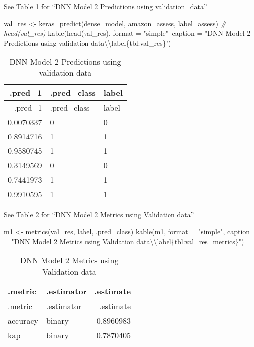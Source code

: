 \documentclass[
]{article}
\newenvironment{Shaded}{}{}
\newcommand{\AttributeTok}[1]{\textcolor[rgb]{0.49,0.56,0.16}{#1}}
\newcommand{\CommentTok}[1]{\textcolor[rgb]{0.38,0.63,0.69}{\textit{#1}}}
\newcommand{\FunctionTok}[1]{\textcolor[rgb]{0.02,0.16,0.49}{#1}}
\newcommand{\NormalTok}[1]{#1}
\newcommand{\OtherTok}[1]{\textcolor[rgb]{0.00,0.44,0.13}{#1}}
\newcommand{\SpecialCharTok}[1]{\textcolor[rgb]{0.25,0.44,0.63}{#1}}
\newcommand{\StringTok}[1]{\textcolor[rgb]{0.25,0.44,0.63}{#1}}
\begin{document}
See Table \ref{tbl:val_res} for ``DNN Model 2 Predictions using
validation\_data''

\begin{Shaded}
\begin{Highlighting}[]
\NormalTok{val\_res }\OtherTok{\textless{}{-}} \FunctionTok{keras\_predict}\NormalTok{(dense\_model, amazon\_assess, label\_assess)}
\CommentTok{\# head(val\_res)}
\FunctionTok{kable}\NormalTok{(}\FunctionTok{head}\NormalTok{(val\_res), }\AttributeTok{format =} \StringTok{"simple"}\NormalTok{, }\AttributeTok{caption =} \StringTok{"DNN Model 2 Predictions using validation data}\SpecialCharTok{\textbackslash{}\textbackslash{}}\StringTok{label\{tbl:val\_res\}"}\NormalTok{)}
\end{Highlighting}
\end{Shaded}

\begin{longtable}[]{@{}rll@{}}
\caption{DNN Model 2 Predictions using validation
data\label{tbl:val_res}}\tabularnewline
\toprule
.pred\_1 & .pred\_class & label \\
\midrule
\endfirsthead
\toprule
.pred\_1 & .pred\_class & label \\
\midrule
\endhead
0.0070337 & 0 & 0 \\
0.8914716 & 1 & 1 \\
0.9580745 & 1 & 1 \\
0.3149569 & 0 & 0 \\
0.7441973 & 1 & 1 \\
0.9910595 & 1 & 1 \\
\bottomrule
\end{longtable}

See Table \ref{tbl:val_res_metrics} for ``DNN Model 2 Metrics using
Validation data''

\begin{Shaded}
\begin{Highlighting}[]
\NormalTok{m1 }\OtherTok{\textless{}{-}} \FunctionTok{metrics}\NormalTok{(val\_res, label, .pred\_class)}
\FunctionTok{kable}\NormalTok{(m1, }\AttributeTok{format =} \StringTok{"simple"}\NormalTok{, }\AttributeTok{caption =} \StringTok{"DNN Model 2 Metrics using Validation data}\SpecialCharTok{\textbackslash{}\textbackslash{}}\StringTok{label\{tbl:val\_res\_metrics\}"}\NormalTok{)}
\end{Highlighting}
\end{Shaded}

\begin{longtable}[]{@{}llr@{}}
\caption{DNN Model 2 Metrics using Validation
data\label{tbl:val_res_metrics}}\tabularnewline
\toprule
.metric & .estimator & .estimate \\
\midrule
\endfirsthead
\toprule
.metric & .estimator & .estimate \\
\midrule
\endhead
accuracy & binary & 0.8960983 \\
kap & binary & 0.7870405 \\
\bottomrule
\end{longtable}
\end{document}
